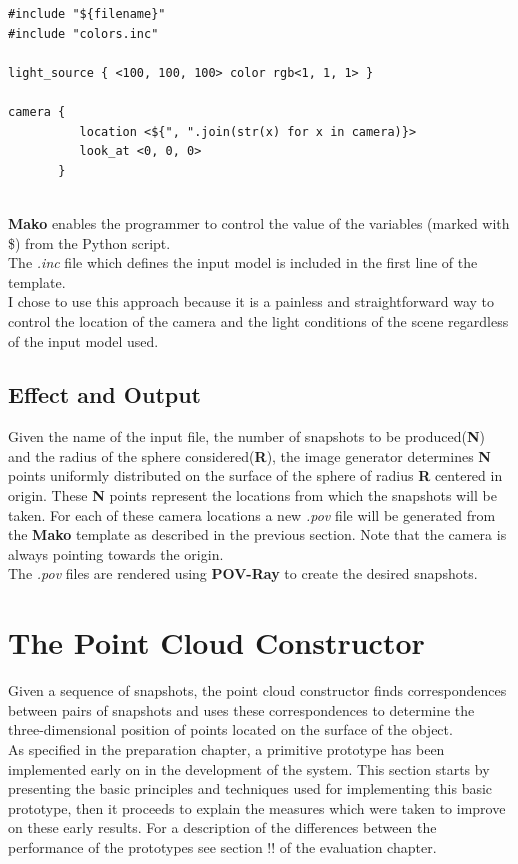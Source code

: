 \documentclass[12pt,a4paper,twoside,openright]{report}
\begin{document}
\begin{verbatim}
#include "${filename}"
#include "colors.inc"

light_source { <100, 100, 100> color rgb<1, 1, 1> }

camera {
          location <${", ".join(str(x) for x in camera)}>
          look_at <0, 0, 0>
       }
\end{verbatim} \\

\textbf{Mako} enables the programmer to control the value of the variables (marked with \$) from the Python script. \\
The \textit{.inc} file which defines the input model is included in the first line of the template. \\
I chose to use this approach because it is a painless and straightforward way to control the location of the camera and the light conditions of the scene regardless of the input model used. 

\subsection{Effect and Output}
Given the name of the input file, the number of snapshots to be produced(\textbf{N}) and the radius of the sphere considered(\textbf{R}), the image generator determines \textbf{N} points uniformly distributed on the surface of the sphere of radius \textbf{R} centered in origin. These \textbf{N} points represent the locations from which the snapshots will be taken. For each of these camera locations a new \textit{.pov} file will be generated from the \textbf{Mako} template as described in the previous section. Note that the camera is always pointing towards the origin. \\
The \textit{.pov} files are rendered using \textbf{POV-Ray} to create the desired snapshots.

\section{The Point Cloud Constructor}
Given a sequence of snapshots, the point cloud constructor finds correspondences between pairs of snapshots and uses these correspondences to determine the three-dimensional position of points located on the surface of the object. \\
\linebreak
As specified in the preparation chapter, a primitive prototype has been implemented early on in the development of the system. This section starts by presenting the basic principles and techniques used for implementing this basic prototype, then it proceeds to explain the measures which were taken to improve on these early results. For a description of the differences between the performance of the prototypes see section !! of the evaluation chapter.
\end{document}
